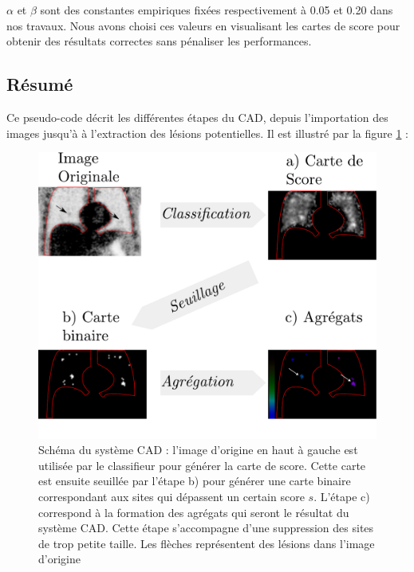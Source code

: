 $\alpha$ et $\beta$ sont des constantes empiriques fixées respectivement à 0.05 et 0.20 dans nos travaux. Nous avons choisi ces valeurs en visualisant les cartes de score pour obtenir des résultats correctes sans pénaliser les performances.

\subsection{Résumé}

Ce pseudo-code décrit les différentes étapes du CAD, depuis l'importation des images jusqu'à à l'extraction des lésions potentielles. Il est illustré par la figure \ref{fig:cheminementCAD} :

\begin{figure}
 \centering
 \includegraphics[width=15cm]{images/cheminementCAD}
 \caption[Schéma du système CAD]{Schéma du système CAD : l'image d'origine en haut à gauche est utilisée par le classifieur pour générer la carte de score. Cette carte est ensuite seuillée par l'étape b) pour générer une carte binaire correspondant aux sites qui dépassent un certain score $s$. L'étape c) correspond à la formation des agrégats qui seront le résultat du système CAD. Cette étape s'accompagne d'une suppression des sites de trop petite taille. Les flèches représentent des lésions dans l'image d'origine}
 \label{fig:cheminementCAD}
\end{figure}

